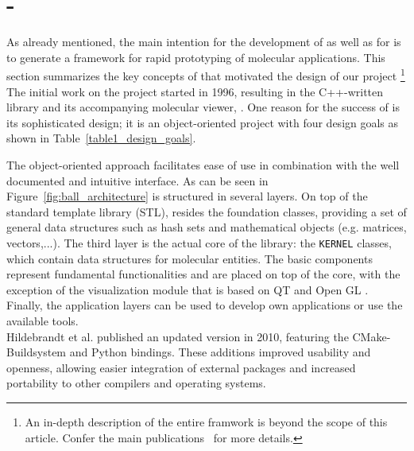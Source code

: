\section{\ball -  \ballFull}
\label{sec:ball}
As already mentioned, the main intention for the development of \ball as well as for \biochem is to generate a framework for rapid prototyping of molecular applications. This section summarizes the key concepts of \ball that motivated the design of our project \footnote{An in-depth description of the entire \ball framwork is beyond the scope of this article. Confer the main publications~\cite{kohlbacher_ballrapid_2000, hildebrandt_ball_2010}  for more details.}\\
The initial work on the \ball project started in 1996, resulting in the C++-written library \ball and its accompanying molecular viewer, \textit{\ballview}. One reason for the success of \ball is its sophisticated design; it is an  object-oriented project with four design goals as shown in Table~\ref{table1_design_goals}.

\begin{table}

	\label{table1_design_goals}
\end{table}

The object-oriented approach facilitates ease of use in combination with the well documented and intuitive interface. As can be seen in Figure~\ref{fig:ball_architecture} \ball is structured in several layers. On top of the standard template library (STL), resides the foundation classes, providing a set of general data structures such as hash sets and mathematical objects (e.g. matrices, vectors,...). The third layer is the actual core of the library: the \texttt{KERNEL} classes, which contain data structures for molecular entities. The basic components represent fundamental functionalities and are placed on top of the core, with the exception of the visualization module that is based on QT and Open GL \cite{Qt5,OpenGLWebsite} . Finally, the application layers can be used to develop own applications or use the available tools. \\
Hildebrandt et al. published an updated version in 2010, featuring the CMake-Buildsystem and Python bindings. These additions improved usability and openness, allowing easier integration of external packages and increased portability to other compilers and operating systems. \\

